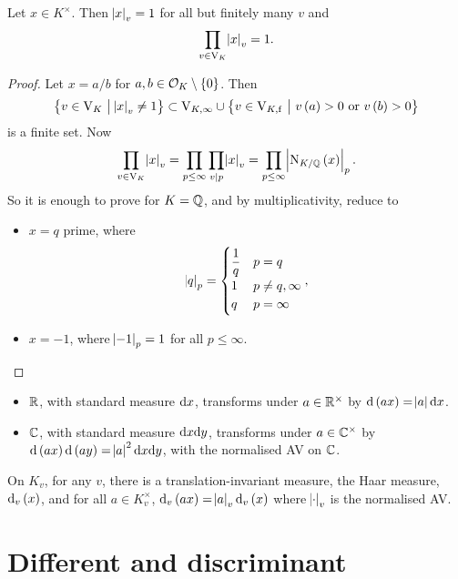 \begin{theorem}
Let $ x \in K^\times $. Then $ \abs{x}_v = 1 $ for all but finitely many $ v $ and
$$ \prod_{v \in \mathrm{V}_K} \abs{x}_v = 1. $$
\end{theorem}

\begin{proof}
Let $ x = a / b $ for $ a, b \in \OOO_K \setminus \cbr{0} $. Then
$$ \cbr{v \in \V_K \st \abs{x}_v \ne 1} \subset \V_{K, \infty} \cup \cbr{v \in \V_{K, \f} \st v\br{a} > 0 \ \text{or} \ v\br{b} > 0} $$
is a finite set. Now
$$ \prod_{v \in \V_K} \abs{x}_v = \prod_{p \le \infty} \prod_{v \mid p} \abs{x}_v = \prod_{p \le \infty} \abs{\N_{K / \QQ}\br{x}}_p. $$
So it is enough to prove for $ K = \mathbb{Q} $, and by multiplicativity, reduce to
\begin{itemize}
\item $ x = q $ prime, where
$$ \abs{q}_p =
\begin{cases}
\dfrac{1}{q} & p = q \\
1 & p \ne q, \infty \\
q & p = \infty
\end{cases},
$$
\item $ x = -1 $, where $ \abs{-1}_p = 1 $ for all $ p \le \infty $.
\end{itemize}
\end{proof}

\begin{remark*}
\hfill
\begin{itemize}
\item $ \mathbb{R} $, with standard measure $ \mathrm{d} x $, transforms under $ a \in \mathbb{R}^\times $ by $ \d\br{ax} = \abs{a}\d x $.
\item $ \mathbb{C} $, with standard measure $ \mathrm{d} x\mathrm{d} y $, transforms under $ a \in \mathbb{C}^\times $ by $ \d\br{ax}\d\br{ay} = \abs{a}^2\d x\d y $, with the normalised AV on $ \mathbb{C} $.
\end{itemize}
\end{remark*}

\begin{fact*}
On $ K_v $, for any $ v $, there is a translation-invariant measure, the Haar measure, $ \d_v\br{x} $, and for all $ a \in K_v^\times $, $ \d_v\br{ax} = \abs{a}_v\d_v\br{x} $ where $ \abs{\cdot}_v $ is the normalised AV.
\end{fact*}

\pagebreak

\section{Different and discriminant}

